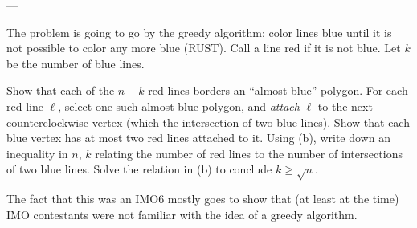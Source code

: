 ---

The problem is going to go by the greedy algorithm:
color lines blue until it is not possible to color any more blue (RUST).
Call a line red if it is not blue.
Let $k$ be the number of blue lines.
\begin{walk}
  \ii Show that each of the $n-k$ red lines
  borders an ``almost-blue'' polygon.
  \ii For each red line $\ell$, select one such almost-blue polygon,
  and \emph{attach} $\ell$ to the next counterclockwise vertex
  (which the intersection of two blue lines).
  Show that each blue vertex has at most two red lines attached to it.
  \ii Using (b), write down an inequality in $n$, $k$
  relating the number of red lines to the number of
  intersections of two blue lines.
  \ii Solve the relation in (b) to conclude $k \ge \sqrt n$.
\end{walk}
The fact that this was an IMO6 mostly goes to show that (at least at the time)
IMO contestants were not familiar with the idea of a greedy algorithm.
